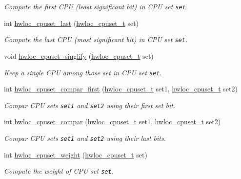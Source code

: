 \begin{CompactItemize}
$$\begin{CompactList}\small\item\em Compute the first CPU (least significant bit) in CPU set {\tt set}. \item\end{CompactList}\item 
int \hyperlink{group__hwlocality__cpuset_g713e886fb6364e6440e911e1c58a7b62}{hwloc\_\-cpuset\_\-last} (\hyperlink{group__hwlocality__cpuset_g82e51d695c430832b703dad5ab8d75e4}{hwloc\_\-cpuset\_\-t} set)
\begin{CompactList}\small\item\em Compute the last CPU (most significant bit) in CPU set {\tt set}. \item\end{CompactList}\item 
void \hyperlink{group__hwlocality__cpuset_g548a6620cce008fc5b1e2110d25135fe}{hwloc\_\-cpuset\_\-singlify} (\hyperlink{group__hwlocality__cpuset_g82e51d695c430832b703dad5ab8d75e4}{hwloc\_\-cpuset\_\-t} set)
\begin{CompactList}\small\item\em Keep a single CPU among those set in CPU set {\tt set}. \item\end{CompactList}\item 
int \hyperlink{group__hwlocality__cpuset_g641ccf476257114e807bd74db0ca9cd0}{hwloc\_\-cpuset\_\-compar\_\-first} (\hyperlink{group__hwlocality__cpuset_g82e51d695c430832b703dad5ab8d75e4}{hwloc\_\-cpuset\_\-t} set1, \hyperlink{group__hwlocality__cpuset_g82e51d695c430832b703dad5ab8d75e4}{hwloc\_\-cpuset\_\-t} set2)
\begin{CompactList}\small\item\em Compar CPU sets {\tt set1} and {\tt set2} using their first set bit. \item\end{CompactList}\item 
int \hyperlink{group__hwlocality__cpuset_ga72d138f3e7a4ea5de4cf7603ef436bf}{hwloc\_\-cpuset\_\-compar} (\hyperlink{group__hwlocality__cpuset_g82e51d695c430832b703dad5ab8d75e4}{hwloc\_\-cpuset\_\-t} set1, \hyperlink{group__hwlocality__cpuset_g82e51d695c430832b703dad5ab8d75e4}{hwloc\_\-cpuset\_\-t} set2)
\begin{CompactList}\small\item\em Compar CPU sets {\tt set1} and {\tt set2} using their last bits. \item\end{CompactList}\item 
int \hyperlink{group__hwlocality__cpuset_g84bda8f4363d5ed3e55ac0634c3bc5cc}{hwloc\_\-cpuset\_\-weight} (\hyperlink{group__hwlocality__cpuset_g82e51d695c430832b703dad5ab8d75e4}{hwloc\_\-cpuset\_\-t} set)
\begin{CompactList}\small\item\em Compute the weight of CPU set {\tt set}. \item\end{CompactList}\end{CompactItemize}


